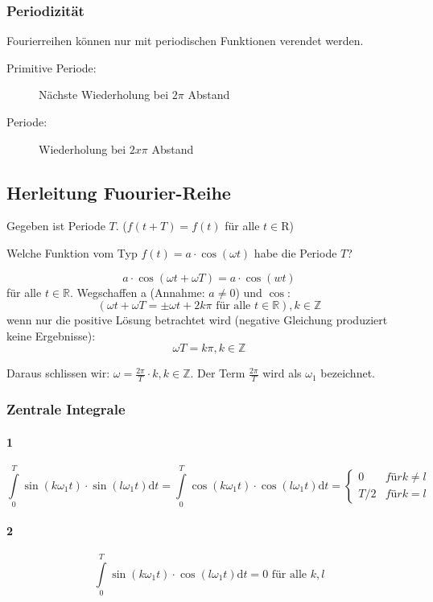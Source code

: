 \subsubsection{Periodizität}

Fourierreihen können nur mit periodischen Funktionen verendet werden.

\begin{description}
	\item[Primitive Periode:] Nächste Wiederholung bei $2\pi$ Abstand
	\item[Periode:] Wiederholung bei $2x\pi$ Abstand
\end{description}

\subsection{Herleitung Fuourier-Reihe}

Gegeben ist Periode $T$. ($f(t+T) = f(t)$ für alle $t \in \mathrm{R}$)

Welche Funktion vom Typ $f(t) = a \cdot \cos(\omega t)$ habe die Periode $T$?

\[
	a \cdot \cos(\omega t + \omega T) = a \cdot \cos(wt)
\]
für alle $t \in \mathbb{R}$. Wegschaffen a (Annahme: $a \neq 0$) und $\cos$:
\[
	(\omega t + \omega T = \pm \omega t + 2k\pi \text{ für alle } t \in \mathbb{R}), k \in \mathbb{Z}
\]
wenn nur die positive Lösung betrachtet wird (negative Gleichung produziert keine Ergebnisse):
\[
	\omega T =  k \pi, k \in \mathbb{Z}
\]

Daraus schlissen wir: $\omega = \frac{2 \pi}{T} \cdot k, k \in \mathbb{Z}$. Der Term $\frac{2 \pi}{T}$ wird als $\omega_1$ bezeichnet.

\subsubsection{Zentrale Integrale}

\paragraph{1}
\[
	\int\limits^T_0 \sin(k \omega_1 t) \cdot \sin(l \omega_1 t) \mathrm{d}t = \int\limits^T_0 \cos(k \omega_1 t) \cdot \cos(l \omega_1 t) \mathrm{d}t = 
	\begin{cases}
	0   &für k \neq l \\
	T/2 &für k = l
	\end{cases}
\]

\paragraph{2}
\[
	\int\limits^T_0 \sin(k \omega_1 t) \cdot \cos(l \omega_1 t) \mathrm{d}t = 0 \text{ für alle } k,l
\]

